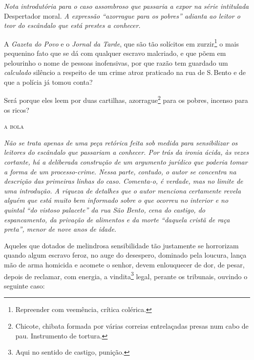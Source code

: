 \begin{resumo}
\emph{Nota introdutória para o caso assombroso que passaria a expor na
série intitulada} Despertador moral. \emph{A expressão ``azorrague para
os pobres'' adianta ao leitor o teor do escândalo que está prestes a
conhecer. }
\end{resumo}

A \emph{Gazeta do Povo} e o \emph{Jornal da Tarde}, que são tão
solícitos em zurzir\footnote{Repreender com veemência, crítica
  colérica.} o mais pequenino fato que se dá com qualquer escravo
malcriado, e que põem em pelourinho o nome de pessoas inofensivas, por
que razão tem guardado um \emph{calculado} silêncio a respeito de um
crime atroz praticado na rua de S.\,Bento e de que a polícia já tomou
conta?

Será porque eles leem por duas cartilhas, azorrague\footnote{Chicote,
  chibata formada por várias correias entrelaçadas presas num cabo de
  pau. Instrumento de tortura.}
para os pobres, incenso
para os ricos?\medskip

\hfill\textsc{a bola}


\begin{resumo}
\emph{Não se trata apenas de uma peça retórica feita sob medida para
sensibilizar os leitores do escândalo que passariam a conhecer. Por trás
da ironia ácida, às vezes cortante, há a deliberada construção de um
argumento jurídico que poderia tomar a forma de um processo-crime. Nessa
parte, contudo, o autor se concentra na descrição das primeiras linhas
do caso. Comenta-o, é verdade, mas no limite de uma introdução. A
riqueza de detalhes que o autor menciona certamente revela alguém que
está muito bem informado sobre o que ocorreu no interior e no quintal
``do vistoso palacete'' da rua São Bento, cena do castigo, do
espancamento, da privação de alimentos e da morte ``daquela cristã de
raça preta'', menor de nove anos de idade. }
\end{resumo}

Aqueles que dotados de melindrosa sensibilidade tão justamente se
horrorizam quando algum escravo feroz, no auge do desespero, dominado
pela loucura, lança mão de arma homicida e acomete o senhor, devem
enlouquecer de dor, de pesar, depois de reclamar, com energia, a
vindita\footnote{Aqui no sentido de castigo, punição.} legal, perante
os tribunais, ouvindo o seguinte caso:

